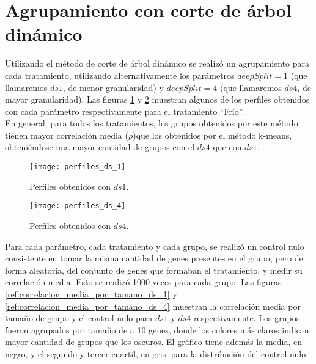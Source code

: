 \section{Agrupamiento con corte de árbol dinámico}
Utilizando el método de corte de árbol dinámico se realizó un agrupamiento para cada tratamiento, utilizando alternativamente los parámetros $deepSplit=1$ (que llamaremos $ds1$, de menor granularidad) y $deepSplit=4$ (que llamaremos $ds4$, de mayor granularidad). Las figuras \ref{fig:perfiles_ds_1} y \ref{fig:perfiles_ds_4} muestran algunos de los perfiles obtenidos con cada parámetro respectivamente para el tratamiento ``Frío''.\\ 
En general, para todos los tratamientos, los grupos obtenidos por este método tienen mayor correlación media ($\rho$)que los obtenidos por el método k-means, obteniéndose una mayor cantidad de grupos con el $ds4$ que con $ds1$.\\
\begin{figure*}[t!]
    \centering
    \begin{subfigure}[t]{0.45\textwidth}
    \centering
    \texttt{[image: perfiles\_ds\_1]}
    \caption{Perfiles obtenidos con $ds1$.}
    \label{fig:perfiles_ds_1}
    \end{subfigure}
    \begin{subfigure}[t]{0.45\textwidth}
    \centering
    \texttt{[image: perfiles\_ds\_4]}
    \caption{Perfiles obtenidos con $ds4$.}
    \label{fig:perfiles_ds_4}
    \end{subfigure}
    \caption{Perfiles de expresión génica obtenidos con el método corte de árbol dinámico para $ds1$ y $ds4$ para el tratamiento 'Frío'. En negro, el valor medio de cada grupo.}
\end{figure*}

Para cada parámetro, cada tratamiento y cada grupo, se realizó un control nulo consistente en tomar la misma cantidad de genes presentes en el grupo, pero de forma aleatoria, del conjunto de genes que formaban el tratamiento, y medir su correlación media. Esto se realizó 1000 veces para cada grupo. Las figuras \ref{ref:correlacion_media_por_tamano_ds_1} y \ref{ref:correlacion_media_por_tamano_ds_4} muestran la correlación media por tamaño de grupo y el control nulo para $ds1$ y $ds4$ respectivamente. Los grupos fueron agrupados por tamaño de a 10 genes, donde los colores más claros indican mayor cantidad de grupos que los oscuros. El gráfico tiene además la media, en negro, y el segundo y tercer cuartil, en gris, para la distribución del control nulo.

